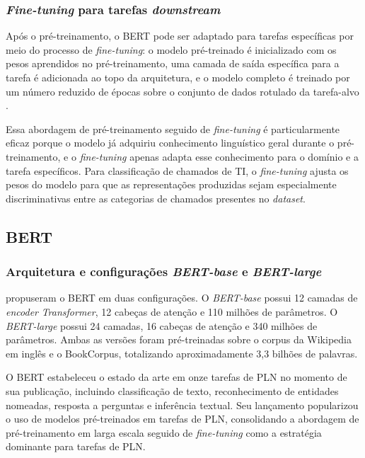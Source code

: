 \documentclass[
    12pt,                %
    openright,           %
    oneside,             %
    a4paper,             %
    english,             %
    brazil               %
]{abntex2}
\begin{document}
\subsubsection{\textit{Fine-tuning} para tarefas \textit{downstream}}
\label{subsubsec:bert_finetune}

Após o pré-treinamento, o BERT pode ser adaptado para tarefas específicas por meio do processo de \textit{fine-tuning}: o modelo pré-treinado é inicializado com os pesos aprendidos no pré-treinamento, uma camada de saída específica para a tarefa é adicionada ao topo da arquitetura, e o modelo completo é treinado por um número reduzido de épocas sobre o conjunto de dados rotulado da tarefa-alvo \cite{devlin2019}.

Essa abordagem de pré-treinamento seguido de \textit{fine-tuning} é particularmente eficaz porque o modelo já adquiriu conhecimento linguístico geral durante o pré-treinamento, e o \textit{fine-tuning} apenas adapta esse conhecimento para o domínio e a tarefa específicos. Para classificação de chamados de TI, o \textit{fine-tuning} ajusta os pesos do modelo para que as representações produzidas sejam especialmente discriminativas entre as categorias de chamados presentes no \textit{dataset}.

\subsection{BERT}
\label{subsec:bert_modelo}

\subsubsection{Arquitetura e configurações \textit{BERT-base} e \textit{BERT-large}}
\label{subsubsec:bert_arquitetura}

 propuseram o BERT em duas configurações. O \textit{BERT-base} possui 12 camadas de \textit{encoder} \textit{Transformer}, 12 cabeças de atenção e 110 milhões de parâmetros. O \textit{BERT-large} possui 24 camadas, 16 cabeças de atenção e 340 milhões de parâmetros. Ambas as versões foram pré-treinadas sobre o corpus da Wikipedia em inglês e o BookCorpus, totalizando aproximadamente 3,3 bilhões de palavras.

O BERT estabeleceu o estado da arte em onze tarefas de PLN no momento 
de sua publicação, incluindo classificação de texto, reconhecimento 
de entidades nomeadas, resposta a perguntas e inferência textual. 
Seu lançamento popularizou o uso de modelos pré-treinados em tarefas 
de PLN, consolidando a abordagem de pré-treinamento em larga escala 
seguido de \textit{fine-tuning} como a estratégia dominante para 
tarefas de PLN.
\end{document}
